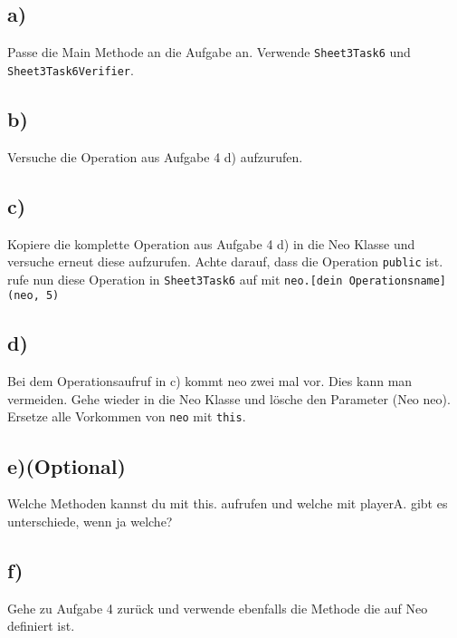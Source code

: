 \subsection*{a)}
	Passe die Main Methode an die Aufgabe an. Verwende \lstinline{Sheet3Task6} und \lstinline{Sheet3Task6Verifier}.
\subsection*{b)}
	Versuche die Operation aus Aufgabe 4 d) aufzurufen.
\subsection*{c)}
	Kopiere die komplette Operation aus Aufgabe 4 d) in die Neo Klasse und versuche erneut diese aufzurufen. Achte darauf, dass die Operation \lstinline{public} ist.
	rufe nun diese Operation in \lstinline{Sheet3Task6} auf mit \lstinline{neo.[dein Operationsname](neo, 5)}
\subsection*{d)} Bei dem Operationsaufruf in c) kommt neo zwei mal vor. Dies kann man vermeiden. Gehe wieder in die Neo Klasse und lösche den Parameter (Neo neo). Ersetze alle Vorkommen von \lstinline{neo} mit \lstinline{this}.
\subsection*{e)(Optional)}Welche Methoden kannst du mit this. aufrufen und welche mit playerA. gibt es unterschiede, wenn ja welche?
\subsection*{f)}Gehe zu Aufgabe 4 zurück und verwende ebenfalls die Methode die auf Neo definiert ist.